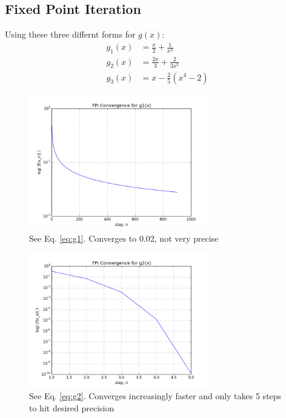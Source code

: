 \documentclass[12pt]{article}
\begin{document}
  \clearpage 

  \subsection{Fixed Point Iteration}
  

  Using these three differnt forms for $g(x)$:\\
  \begin{align}
    \label{eq:g1}
    g_1(x) &= \frac{x}{2} + \frac{1}{x^3} \\
    \label{eq:g2}
    g_2(x) &= \frac{2x}{3} + \frac{2}{3x^3} \\
    \label{eq:g3}
    g_3(x) &= x - \frac{2}{5}(x^4-2)
  \end{align}

  \begin{figure}[h]
    \centering
    \includegraphics[width=0.7\textwidth]{Problem4da.png}
    \caption{See Eq. \ref{eq:g1}. Converges to 0.02, not very precise}
  \end{figure}


  \begin{figure}[h]
    \centering
    \includegraphics[width=0.7\textwidth]{Problem4db.png}
    \caption{See Eq. \ref{eq:g2}. Converges increasingly faster and only takes 5 steps to hit
            desired precision}
  \end{figure}
\end{document}
